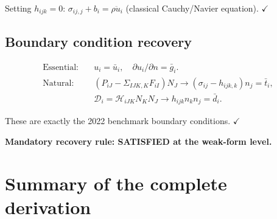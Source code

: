 \documentclass[11pt]{article}
\begin{document}
Setting $h_{ijk}=0$: $\sigma_{ij,j}+b_{i}=\rho\ddot{u}_{i}$
(classical Cauchy/Navier equation). $\checkmark$

\subsection{Boundary condition recovery}

\begin{align}
\text{Essential:}&\quad
u_{i}=\bar{u}_{i},\quad
\partial u_{i}/\partial n = \bar{g}_{i}.
\\
\text{Natural:}&\quad
(P_{iJ}-\Sigma_{IJK,K}F_{iI})N_{J}
\to (\sigma_{ij}-h_{ijk,k})n_{j} = \bar{t}_{i},
\\
&\quad
\mathcal{D}_{i}=\mathcal{H}_{iJK}N_{K}N_{J}
\to h_{ijk}n_{k}n_{j} = \bar{d}_{i}.
\end{align}

These are exactly the 2022 benchmark boundary conditions. $\checkmark$

\textbf{Mandatory recovery rule: SATISFIED at the weak-form level.}

\section{Summary of the complete derivation}
\end{document}
